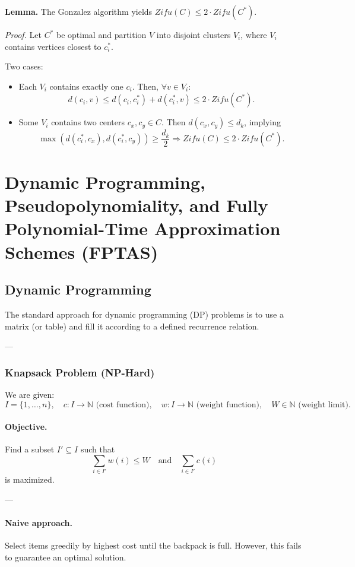 \documentclass{article}
\begin{document}
\textbf{Lemma.}  
The Gonzalez algorithm yields $Zifu(C) \leq 2 \cdot Zifu(C^*)$.

\emph{Proof.}  
Let $C^*$ be optimal and partition $V$ into disjoint clusters $V_i$, where $V_i$ contains vertices closest to $c^*_i$.

Two cases:
\begin{itemize}
    \item Each $V_i$ contains exactly one $c_i$.  
    Then, $\forall v \in V_i$:
    \[
    d(c_i, v) \leq d(c_i, c^*_i) + d(c^*_i, v) \leq 2 \cdot Zifu(C^*).
    \]
    \item Some $V_i$ contains two centers $c_x, c_y \in C$.  
    Then $d(c_x, c_y) \leq d_k$, implying
    \[
    \max(d(c^*_i, c_x), d(c^*_i, c_y)) \ge \frac{d_k}{2}
    \Rightarrow Zifu(C) \le 2 \cdot Zifu(C^*).
    \]
\end{itemize}
\section{Dynamic Programming, Pseudopolynomiality, and Fully Polynomial-Time Approximation Schemes (FPTAS)}

\subsection{Dynamic Programming}

The standard approach for dynamic programming (DP) problems is to use a matrix (or table) and fill it according to a defined recurrence relation.

---

\subsubsection{Knapsack Problem (NP-Hard)}

We are given:
\[
I = \{1, \dots, n\}, \quad
c: I \to \mathbb{N} \text{ (cost function)}, \quad
w: I \to \mathbb{N} \text{ (weight function)}, \quad
W \in \mathbb{N} \text{ (weight limit)}.
\]

\paragraph{Objective.}  
Find a subset $I' \subseteq I$ such that
\[
\sum_{i \in I'} w(i) \le W
\quad \text{and} \quad
\sum_{i \in I'} c(i)
\]
is maximized.

---

\paragraph{Naive approach.}  
Select items greedily by highest cost until the backpack is full.  
However, this fails to guarantee an optimal solution.
\end{document}
